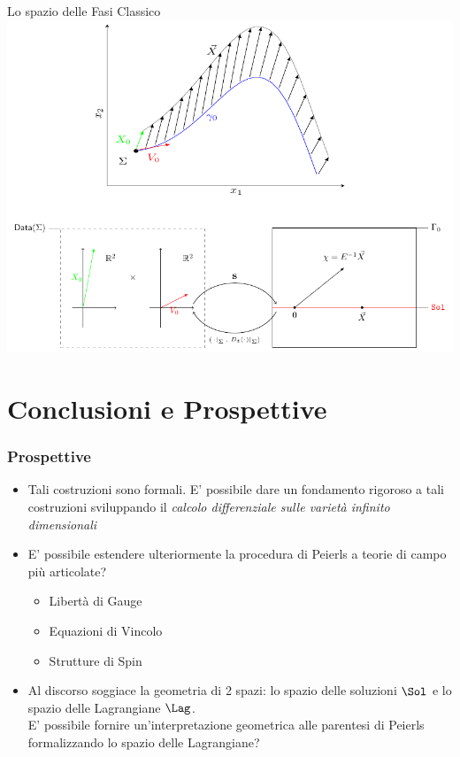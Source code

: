 \documentclass[8pt,handout]{beamer}
\begin{document}
\begin{frame}{Lo spazio delle Fasi Classico}
					\includegraphics[width=\textwidth]{Pictures/Jacobi_GeometricPicturePanoramica}	

\end{frame}	

	


\section*{Conclusioni e Prospettive}

	\begin{frame}
		\frametitle{ Prospettive}
			\begin{itemize}
				\item Tali costruzioni sono formali. E' possibile dare un fondamento rigoroso a tali costruzioni sviluppando il \emph{calcolo differenziale sulle varietà infinito dimensionali} 
				\item E' possibile estendere ulteriormente la procedura di Peierls a teorie di campo più articolate?
					\begin{itemize}
						\item Libertà di Gauge
						\item Equazioni di Vincolo
						\item Strutture di Spin
					\end{itemize}
				\item Al discorso soggiace la geometria di 2 spazi: lo spazio delle soluzioni $\Sol$ e lo spazio delle Lagrangiane $\Lag$.\\
					E' possibile fornire un'interpretazione geometrica alle parentesi di Peierls formalizzando lo spazio delle Lagrangiane?
			\end{itemize}
	\end{frame}
\end{document}
